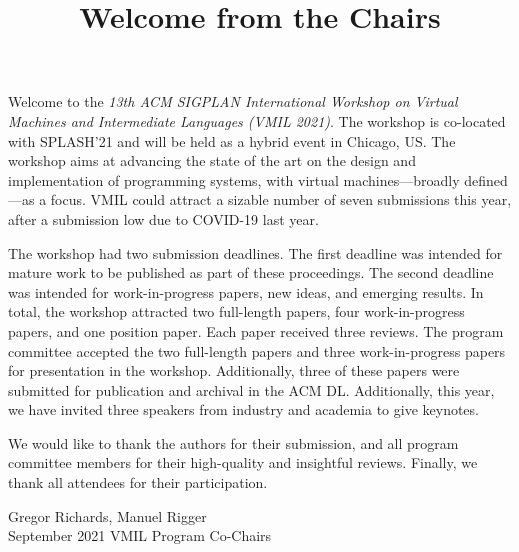 \documentclass[12pt,letterpaper]{article}
\begin{document}
\title{\sffamily\bfseries Welcome from the Chairs}
\date{}

\maketitle
\thispagestyle{empty}
\pagestyle{empty}

Welcome to the \emph{13th ACM SIGPLAN International Workshop on Virtual Machines and Intermediate Languages (VMIL 2021)}. The workshop is co-located with SPLASH'21 and will be held as a hybrid event in Chicago, US.
The workshop aims at advancing the state of the art on the design and implementation of programming systems, with virtual machines---broadly defined---as a focus.
VMIL could attract a sizable number of seven submissions this year, after a submission low due to COVID-19 last year.

The workshop had two submission deadlines. The first deadline was intended for mature work to be published as part of these proceedings.
The second deadline was intended for work-in-progress papers, new ideas, and emerging results.
In total, the workshop attracted two full-length papers, four work-in-progress papers, and one position paper.
Each paper received three reviews.
The program committee accepted the two full-length papers and three work-in-progress papers for presentation in the workshop.
Additionally, three of these papers were submitted for publication and archival in the ACM DL.
Additionally, this year, we have invited three speakers from industry and academia to give keynotes.

We would like to thank the authors for their submission, and all program
committee members for their high-quality and insightful reviews. Finally, we thank
all attendees for their participation.

\bigskip
\noindent
       \hfill Gregor Richards, Manuel Rigger\\
September 2021 \hfill VMIL Program Co-Chairs
\end{document}

